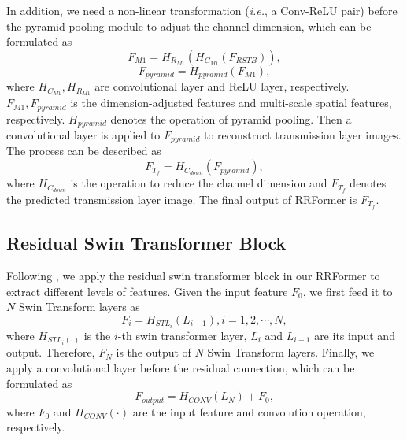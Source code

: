 \documentclass[10pt,journal]{IEEEtran}
\begin{document}
In addition, we need a non-linear transformation (\textit{i.e.}, a Conv-ReLU pair) before the pyramid pooling module to adjust the channel dimension, which can be formulated as
\begin{equation}
	F_{M1}=H_{R_{M1}}\left (  H_{C_{M1}} \left ( F_{RSTB} \right ) \right ) 
	, \label{eq_convrelu}
\end{equation}
\begin{equation}
	F_{pyramid}=H_{pyramid} \left ( F_{M1} \right )  
	, \label{eq_pyramid}
\end{equation}
where $H_{C_{M1}}, H_{R_{M1}}$ are convolutional layer and ReLU layer, respectively. $F_{M1}, F_{pyramid}$ is the dimension-adjusted features and multi-scale spatial features, respectively. $H_{pyramid}$ denotes the operation of pyramid pooling. 
Then a convolutional layer is applied to $F_{pyramid}$ to reconstruct transmission layer images. The process can be described as
\begin{equation}
	F_{T_{f}}=H_{C_{down}} \left ( F_{pyramid} \right )  
	, \label{eq_RRFormer}
\end{equation}
where $H_{C_{down}}$ is the operation to reduce the channel dimension and $F_{T_{f}}$ denotes the predicted transmission layer image. The final output of RRFormer is $F_{T_{f}}$.

\subsection{Residual Swin Transformer Block}\label{RSTB}
Following \cite{liangSwinirImageRestoration2021}, we apply the residual swin transformer block in our RRFormer to extract different levels of features. Given the input feature $F_{0}$, we first feed it to $N$ Swin Transform layers as 
\begin{equation}
	F_{i} = H_{{STL}_{i}}\left ( L_{i-1} \right ) , i = 1,2,\cdots,N, \label{eq3}
\end{equation}
where $H_{STL_{i}\left ( \cdot \right )}$ is the $i$-th swin transformer layer, $L_{i}$ and $L_{i-1}$ are its input and output. Therefore, $F_{N}$ is the output of $N$ Swin Transform layers. 
Finally, we apply a convolutional layer before the residual connection, which can be formulated as
\begin{equation}
	F_{output} = H_{CONV}\left ( L_{N} \right ) + F_{0} , \label{eq4}
\end{equation}
where $F_{0}$ and $H_{CONV}\left ( \cdot \right )$ are the input feature and convolution operation, respectively.
\end{document}
